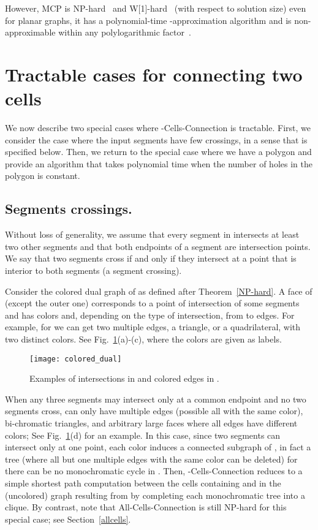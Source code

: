 \documentclass[11pt,a4paper]{article}
\begin{document}
However, MCP is NP-hard~\cite{BLWZ05} and W[1]-hard~\cite{FGK10} (with respect to solution size) even for planar graphs, it has a polynomial-time -approximation algorithm and is non-approximable within any polylogarithmic factor~\cite{HMS07}. 

\section{Tractable cases for connecting two cells}

We now describe two special cases where {\sc -Cells-Connection} is tractable. First, we consider the case where the input segments
have few crossings, in a sense that is specified below. Then, we return to the special case where we have a polygon and provide an algorithm
that takes polynomial time when the number of holes in the polygon is constant.
 
\subsection{Segments crossings.}
Without loss of generality, we assume that every segment in  intersects at least two other segments and that both endpoints of a segment are intersection points. We say that two segments cross if and only if they intersect at a point that is interior to both segments (a segment crossing).

Consider the colored dual graph  of  as defined after Theorem~\ref{NP-hard}. A face of  (except the outer one) corresponds to a point of intersection of some  segments and has  colors and, depending on the type of intersection, from  to  edges. 
For example, for  we can get two multiple edges, a triangle, or a quadrilateral, with two distinct colors. See Fig.~\ref{fig:colored_dual}(a)-(c), where the colors are given as labels.

\begin{figure}[t]
\centering
\texttt{[image: colored\_dual]}
\caption{Examples of intersections in  and colored edges in .}
\label{fig:colored_dual}
\end{figure}

When any three segments may intersect only at a common endpoint and no two segments cross,  can only have multiple edges (possible all with the same color), bi-chromatic triangles, and arbitrary large faces where all edges have different colors; See Fig.~\ref{fig:colored_dual}(d) for an example. In this case, since two segments can intersect only at one point, each color induces a connected subgraph of , in fact a tree (where all but one multiple edges with the same color can be deleted) for there can be no monochromatic cycle in .  Then, {\sc -Cells-Connection} reduces to a simple shortest path computation between the cells containing  and  in the (uncolored) graph resulting from  by completing each monochromatic tree into a clique.
By contrast, note that {All-Cells-Connection} is still NP-hard for this special case; see Section~\ref{allcells}.
\end{document}
